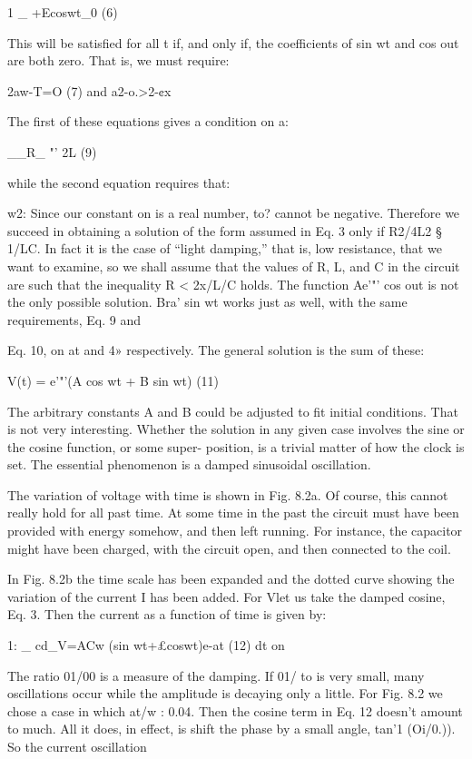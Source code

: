 1 _
+Ecoswt_0 (6)

This will be satisfied for all t if, and only if, the coefficients of sin wt
and cos out are both zero. That is, we must require:

2aw-T=O (7)
and
a2-o.>2-¢x%

The first of these equations gives a condition on a:

__R_
"' 2L (9)

while the second equation requires that:

w2:%
Since our constant on is a real number, to? cannot be negative.
Therefore we succeed in obtaining a solution of the form assumed in
Eq. 3 only if R2/4L2 § 1/LC. In fact it is the case of ``light
damping,'' that is, low resistance, that we want to examine, so we
shall assume that the values of R, L, and C in the circuit are such that
the inequality R < 2x/L/C holds.
The function Ae'"' cos out is not the only possible solution.
Bra' sin wt works just as well, with the same requirements, Eq. 9 and

Eq. 10, on at and 4» respectively. The general solution is the sum of
these:

V(t) = e'"'(A cos wt + B sin wt) (11)

The arbitrary constants A and B could be adjusted to fit initial
conditions. That is not very interesting. Whether the solution in
any given case involves the sine or the cosine function, or some super-
position, is a trivial matter of how the clock is set. The essential
phenomenon is a damped sinusoidal oscillation.

The variation of voltage with time is shown in Fig. 8.2a. Of course,
this cannot really hold for all past time. At some time in the past
the circuit must have been provided with energy somehow, and then
left running. For instance, the capacitor might have been charged,
with the circuit open, and then connected to the coil.

In Fig. 8.2b the time scale has been expanded and the dotted curve
showing the variation of the current I has been added. For Vlet us
take the damped cosine, Eq. 3. Then the current as a function of time
is given by:

1: _ cd_V=ACw (sin wt+£coswt)e-at (12)
dt on

The ratio 01/00 is a measure of the damping. If 01/ to is very small,
many oscillations occur while the amplitude is decaying only a little.
For Fig. 8.2 we chose a case in which at/w : 0.04. Then the cosine
term in Eq. 12 doesn't amount to much. All it does, in effect, is shift
the phase by a small angle, tan'1 (Oi/0.)). So the current oscillation

